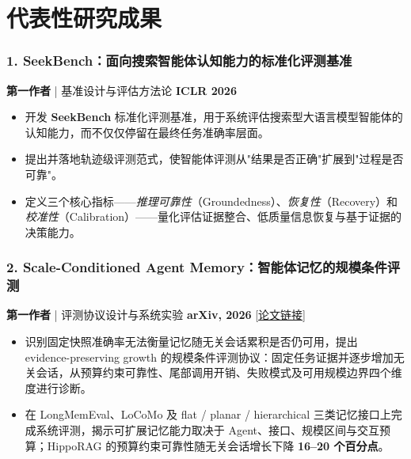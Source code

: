 \documentclass[10pt,a4paper]{article}
\begin{document}
\section*{\color{sectioncolor}代表性研究成果}
\subsubsection*{1. \color{itemcolor}SeekBench：面向搜索智能体认知能力的标准化评测基准}
\noindent\textbf{\color{sectioncolor}第一作者} | 基准设计与评估方法论 \hfill \color{accentcolor}\textbf{ICLR 2026}
\begin{itemize}[leftmargin=*]
    \item 开发 \textbf{SeekBench} 标准化评测基准，用于系统评估搜索型大语言模型智能体的认知能力，而不仅仅停留在最终任务准确率层面。
    \item 提出并落地轨迹级评测范式，使智能体评测从"结果是否正确"扩展到"过程是否可靠"。
    \item 定义三个核心指标——\textit{推理可靠性}（Groundedness）、\textit{恢复性}（Recovery）和\textit{校准性}（Calibration）——量化评估证据整合、低质量信息恢复与基于证据的决策能力。
\end{itemize}

\subsubsection*{2. \color{itemcolor}Scale-Conditioned Agent Memory：智能体记忆的规模条件评测}
\noindent\textbf{\color{sectioncolor}第一作者} | 评测协议设计与系统实验 \hfill \color{accentcolor}\textbf{arXiv, 2026}
\noindent\href{https://arxiv.org/abs/2605.07313}{\color{linkcolor}[论文链接]}
\begin{itemize}[leftmargin=*]
    \item 识别固定快照准确率无法衡量记忆随无关会话累积是否仍可用，提出 evidence-preserving growth 的规模条件评测协议：固定任务证据并逐步增加无关会话，从预算约束可靠性、尾部调用开销、失败模式及可用规模边界四个维度进行诊断。
    \item 在 LongMemEval、LoCoMo 及 flat / planar / hierarchical 三类记忆接口上完成系统评测，揭示可扩展记忆能力取决于 Agent、接口、规模区间与交互预算；HippoRAG 的预算约束可靠性随无关会话增长下降 \textbf{16--20 个百分点}。
\end{itemize}
\end{document}
